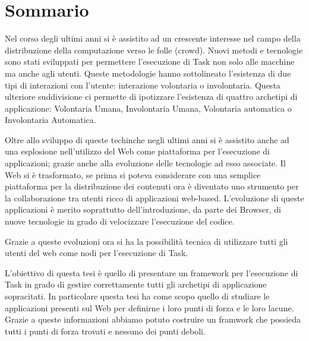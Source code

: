 \cleardoublepage
{}
{}
\begingroup
\let\clearpage\relax
\let\cleardoublepage\relax
\let\cleardoublepage\relax

\chapter*{Sommario}

Nel corso degli ultimi anni si è assistito ad un crescente interesse nel campo
della distribuzione della computazione verso le folle (crowd). Nuovi metodi
e tecnologie sono stati sviluppati per permettere l'esecuzione di Task non solo
alle macchine ma anche agli utenti. Queste metodologie hanno sottolineato
l'esistenza di due tipi di interazioni con l'utente: interazione volontaria
o involontaria. Questa ulteriore suddivisione ci permette di ipotizzare l'esistenza
di quattro archetipi di applicazione: Volontaria Umana, Involontaria Umana, Volontaria
automatica o Involontaria Automatica.

Oltre allo sviluppo di queste techinche negli ultimi anni si è assistito anche
ad una esplosione nell'utilizzo del Web come piattaforma per l'esecuzione di applicazioni; grazie anche alla evoluzione delle tecnologie ad esso associate.
Il Web si è trasformato, se prima si poteva considerare con una semplice piattaforma
per la distribuzione dei contenuti ora è diventato uno strumento per la collaborazione
tra utenti ricco di applicazioni web-based. L'evoluzione di queste applicazioni
è merito soprattutto dell'introduzione, da parte dei Browser, di nuove tecnologie
in grado di velocizzare l'esecuzione del codice.

Grazie a queste evoluzioni ora si ha la possibilità tecnica di utilizzare tutti gli
utenti del web come nodi per l'esecuzione di Task.

L'obiettivo di questa tesi è quello di presentare un framework per l'esecuzione
di Task in grado di gestire correttamente tutti gli archetipi di applicazione
sopracitati. In particolare questa tesi ha come scopo quello di studiare le
applicazioni presenti sul Web per definirne i loro punti di forza e le loro lacune.
Grazie a queste informazioni abbiamo potuto costruire un framwork che possieda
tutti i punti di forza trovati e nessuno dei punti deboli.



\vfill

